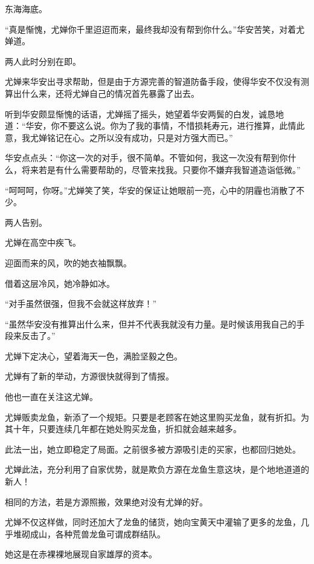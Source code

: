 
\begin{this_body}



东海海底。

“真是惭愧，尤婵你千里迢迢而来，最终我却没有帮到你什么。”华安苦笑，对着尤婵道。

两人此时分别在即。

尤婵来华安出寻求帮助，但是由于方源完善的智道防备手段，使得华安不仅没有测算出什么来，还将尤婵自己的情况首先暴露了出去。

听到华安颇显惭愧的话语，尤婵摇了摇头，她望着华安两鬓的白发，诚恳地道：“华安，你不要这么说。你为了我的事情，不惜损耗寿元，进行推算，此情此意，我尤婵铭记在心。之所以没有成功，只是对方强大而已。”

华安点点头：“你这一次的对手，很不简单。不管如何，我这一次没有帮到你什么，将来若是有什么需要帮助的，尽管来找我。只要你不嫌弃我智道造诣低微。”

“呵呵呵，你呀。”尤婵笑了笑，华安的保证让她眼前一亮，心中的阴霾也消散了不少。

两人告别。

尤婵在高空中疾飞。

迎面而来的风，吹的她衣袖飘飘。

借着这层冷风，她冷静如冰。

“对手虽然很强，但我不会就这样放弃！”

“虽然华安没有推算出什么来，但并不代表我就没有力量。是时候该用我自己的手段来反击了。”

尤婵下定决心，望着海天一色，满脸坚毅之色。

尤婵有了新的举动，方源很快就得到了情报。

他也一直在关注这尤婵。

尤婵贩卖龙鱼，新添了一个规矩。只要是老顾客在她这里购买龙鱼，就有折扣。为其十年，只要连续几年都在她处购买龙鱼，折扣就会越来越多。

此法一出，她立即稳定了局面。之前很多被方源吸引走的买家，也都回归她处。

尤婵此法，充分利用了自家优势，就是欺负方源在龙鱼生意这块，是个地地道道的新人！

相同的方法，若是方源照搬，效果绝对没有尤婵的好。

尤婵不仅这样做，同时还加大了龙鱼的储货，她向宝黄天中灌输了更多的龙鱼，几乎堆砌成山，各种荒兽龙鱼可谓成群结队。

她这是在赤裸裸地展现自家雄厚的资本。


\end{this_body}
